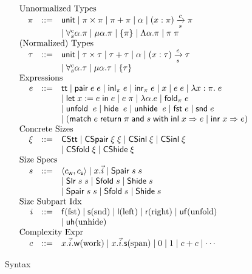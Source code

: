 \documentclass[preprint]{sigplanconf}
\newcommand{\thide}[1]{\left \{ #1 \right \}}
\newcommand{\arrow}[4]{#1\xrightarrow[#3]{#2}#4}
\newcommand{\symlet}{\mathsf{let\;}}
\newcommand{\symin}{\mathsf{\;in\;}}
\newcommand{\symand}{\mathsf{\;and\;}}
\newcommand{\symmatch}{\mathsf{match}}
\newcommand{\symwith}{\mathsf{\;with\;}}
\newcommand{\symreturn}{\mathsf{\;return\;}}
\newcommand{\syminl}{\mathsf{inl}}
\newcommand{\syminr}{\mathsf{inr}}
\newcommand{\symfold}{\mathsf{fold}}
\newcommand{\symSfold}{\mathsf{Sfold}}
\newcommand{\symunfold}{\mathsf{unfold}}
\newcommand{\symhide}{\mathsf{hide}}
\newcommand{\symShide}{\mathsf{Shide}}
\newcommand{\symunhide}{\mathsf{unhide}}
\newcommand{\sympair}{\mathsf{pair}}
\newcommand{\symtt}{\mathsf{tt}}
\newcommand{\symunit}{\mathsf{unit}}
\newcommand{\symCStt}{\mathsf{CStt}}
\newcommand{\symCSpair}{\mathsf{CSpair}}
\newcommand{\symCSinl}{\mathsf{CSinl}}
\newcommand{\symCSfold}{\mathsf{CSfold}}
\newcommand{\symCShide}{\mathsf{CShide}}
\newcommand{\intro}[2]{(#1 : #2)}
\newcommand{\symfst}{\mathsf{fst}}
\newcommand{\symsnd}{\mathsf{snd}}
\newcommand{\symuf}{\mathsf{uf}}
\newcommand{\symuh}{\mathsf{uh}}
\newcommand{\syml}{\mathsf{l}}
\newcommand{\symr}{\mathsf{r}}
\newcommand{\symf}{\mathsf{f}}
\newcommand{\syms}{\mathsf{s}}
\newcommand{\symSpair}{\mathsf{Spair}}
\newcommand{\symSlr}{\mathsf{Slr}}
\newcommand{\symwork}{\mathsf{w}}
\newcommand{\symspan}{\mathsf{s}}
\newcommand{\Sstats}[1]{\left \langle #1 \right \rangle}
\begin{document}
\begin{figure}
$$\begin{array}{rrcl}
  \multicolumn{4}{l}{\textrm{Unnormalized Types}} \\
  & \pi &::=& \symunit \mid \pi\times\pi \mid \pi+\pi \mid \alpha \mid \arrow{\intro{x}{\pi}}{c}{s}{\pi} \\
  & & & \mid \forall^c_s \alpha.\pi \mid \mu \alpha.\pi \mid \thide\pi \mid \Lambda \alpha.\pi \mid \pi\;\pi \\
  \multicolumn{4}{l}{\textrm{(Normalized) Types}} \\
  & \tau &::=& \symunit \mid \tau\times\tau \mid \tau+\tau \mid \alpha \mid \arrow{\intro{x}{\tau}}{c}{s}{\tau} \\
  & & & \mid \forall^c_s \alpha.\tau \mid \mu \alpha.\tau \mid \thide\tau \\
  \multicolumn{4}{l}{\textrm{Expressions}} \\
  & e &::=& \symtt \mid \sympair\;e\;e \mid \syminl_\pi\;e \mid \syminr_\pi\;e \mid x \mid e\;e \mid \lambda x:\pi.\;e \\
  & & & \mid \symlet x := e \symin e \mid e\;\pi \mid \lambda \alpha.e \mid \symfold_\pi\;e \\
  & & & \mid \symunfold\;\;e \mid \symhide\;\;e \mid \symunhide\;\;e \mid \symfst\;e \mid \symsnd\;e \\
  & & & \mid (\symmatch\;e \symreturn \pi \symand s \symwith \syminl\;x\Rightarrow e\;|\;\syminr\;x\Rightarrow e) \\
  \multicolumn{4}{l}{\textrm{Concrete Sizes}} \\
  & \xi &::=& \symCStt \mid \symCSpair\;\xi\;\xi \mid \symCSinl\;\xi \mid \symCSinl\;\xi \\
  & & & \mid \symCSfold\;\xi \mid \symCShide\;\xi \\
  \multicolumn{4}{l}{\textrm{Size Specs}} \\
  & s &::=& \Sstats{c_\symwork,c_\symspan} \mid x.\vec{i} \mid \symSpair\;s\;s \\
  & & & \mid \symSlr\;s\;s \mid \symSfold\;s \mid \symShide\;s \\
  & & & \mid \symSpair\;s\;s \mid \symSfold\;s \mid \symShide\;s \\
  \multicolumn{4}{l}{\textrm{Size Subpart Idx}} \\
  & i &::=& \symf \textrm{(fst)} \mid \syms \textrm{(snd)} \mid \syml \textrm{(left)} \mid \symr \textrm{(right)} \mid \symuf \textrm{(unfold)} \\
  & & & \mid \symuh \textrm{(unhide)} \\
  \multicolumn{4}{l}{\textrm{Complexity Expr}} \\
  & c &::=& x.\vec{i}.\symwork \textrm{(work)} \mid x.\vec{i}.\symspan \textrm{(span)} \mid 0 \mid 1 \mid c+c \mid \cdots \\
\end{array}$$
\caption{\label{syntax}Syntax}
\end{figure}
\end{document}
